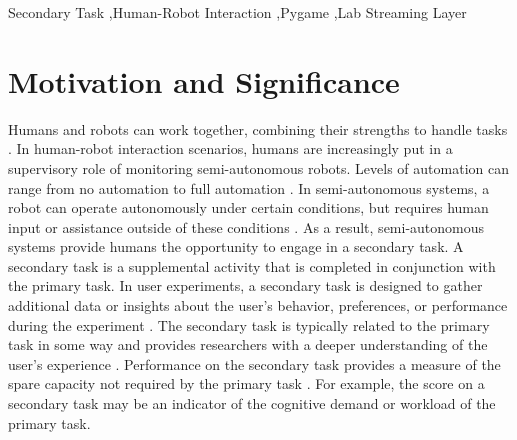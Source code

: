 \documentclass[preprint,12pt, a4paper]{elsarticle}
\begin{document}
\begin{frontmatter}
\begin{keyword}

Secondary Task \sep Human-Robot Interaction \sep Pygame \sep Lab Streaming Layer


\end{keyword}


\end{frontmatter}



\section{Motivation and Significance}
Humans and robots can work together, combining their strengths to handle tasks \cite{ali2022considerations, ali2022heterogeneous}. In human-robot interaction scenarios, humans are increasingly put in a supervisory role of monitoring semi-autonomous robots. Levels of automation can range from no automation to full automation \cite{sheridan1978human, parasuraman2000model}. In semi-autonomous systems, a robot can operate autonomously under certain conditions, but requires human input or assistance outside of these conditions \cite{Zilberstein_2015}. As a result, semi-autonomous systems provide humans the opportunity to engage in a secondary task. A secondary task is a supplemental activity that is completed in conjunction with the primary task. In user experiments, a secondary task is designed to gather additional data or insights about the user's behavior, preferences, or performance during the experiment \cite{mahr2012contre}. The secondary task is typically related to the primary task in some way and provides researchers with a deeper understanding of the user's experience \cite{COLLET20091041}. Performance on the secondary task provides a measure of the spare capacity not required by the primary task \cite{Kerr1973ProcessingDD}. For example, the score on a secondary task may be an indicator of the cognitive demand or workload of the primary task. 

\vspace{2mm}
\end{document}
